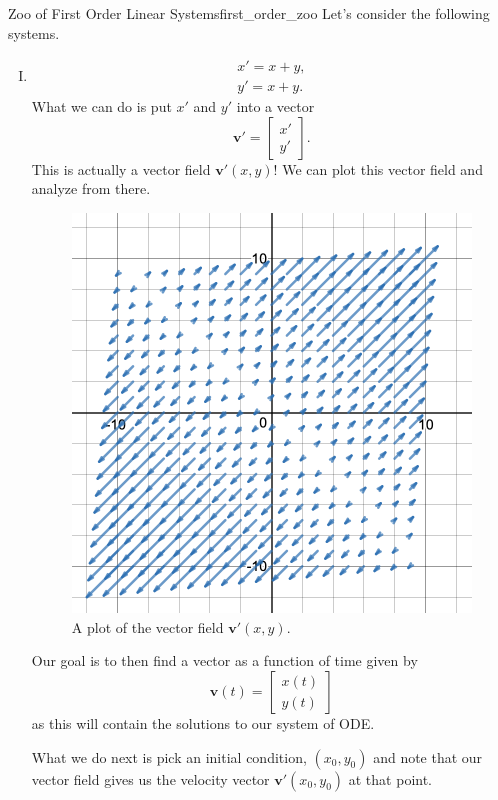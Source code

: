         \begin{ex}{Zoo of First Order Linear Systems}{first_order_zoo}
        Let's consider the following systems.
        
        \begin{enumerate}[(I)]
            \item 
            \begin{align*}
                x' = x+y,\\
                y' = x+y.
            \end{align*}
            What we can do is put $x'$ and $y'$ into a vector 
            \[
            \mathbf{v}' = \begin{bmatrix} x' \\ y' \end{bmatrix}.
            \]
            This is actually a vector field $\mathbf{v}'(x,y)$!  We can plot this vector field and analyze from there.
            \begin{figure}[H]
                \centering
                \includegraphics[width=.6\textwidth]{Figures/x+yx+y.png}
                \caption{A plot of the vector field $\mathbf{v}'(x,y)$.}
            \end{figure}
            Our goal is to then find a vector as a function of time given by
            \[
            \mathbf{v}(t) = \begin{bmatrix} x(t) \\ y(t) \end{bmatrix}
            \]
            as this will contain the solutions to our system of ODE.
            
            What we do next is pick an initial condition, $(x_0,y_0)$ and note that our vector field gives us the velocity vector $\mathbf{v}'(x_0,y_0)$ at that point. 
            

\end{enumerate}
\end{ex}
